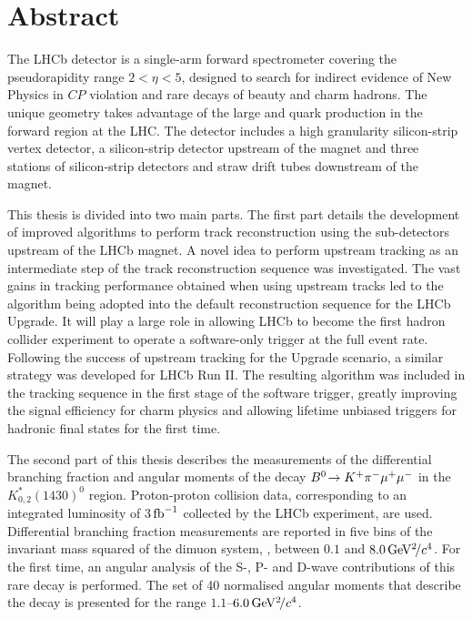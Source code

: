 \section*{Abstract}

The LHCb detector is a single-arm forward spectrometer covering the pseudorapidity range $2 < \eta < 5$, designed to search for indirect evidence of New Physics in $C\!P$ violation and rare decays of beauty and charm hadrons. The unique geometry takes advantage of the large \bquark and \cquark quark production in the forward region at the LHC. The detector includes a high granularity silicon-strip vertex detector, a silicon-strip detector upstream of the magnet and three stations of silicon-strip detectors and straw drift tubes downstream of the magnet.

This thesis is divided into two main parts. The first part details the development of improved algorithms to perform track reconstruction using the sub-detectors upstream of the LHCb magnet. A novel idea to perform upstream tracking as an intermediate step of the track reconstruction sequence was investigated. The vast gains in tracking performance obtained when using upstream tracks led to the algorithm being adopted into the default reconstruction sequence for the LHCb Upgrade. It will play a large role in allowing LHCb to become the first hadron collider experiment to operate a software-only trigger at the full event rate. Following the success of upstream tracking for the Upgrade scenario, a similar strategy was developed for LHCb Run II. The resulting algorithm was included in the tracking sequence in the first stage of the software trigger, greatly improving the signal efficiency for charm physics and allowing lifetime unbiased triggers for hadronic final states for the first time.

The second part of this thesis describes the measurements of the differential branching fraction and angular moments of the decay ${B}^0\!\rightarrow K^{+}\pi^{-}\mu^{+}\mu^{-}$ in the $K^{*}_{0,2}(1430)^{0}$ region. Proton-proton collision data, corresponding to an integrated luminosity of 3$\mbox{\,fb}^{-1}$ collected by the LHCb experiment, are used. Differential branching fraction measurements are reported in five bins of the invariant mass squared of the dimuon system, \qsq, between $0.1$ and $8.0{\mathrm{\,Ge\kern -0.1em V^2\!/}c^4}$. For the first time, an angular analysis of the S-, P- and D-wave contributions of this rare decay is performed. The set of 40 normalised angular moments that describe the decay is presented for the \qsq range $1.1$--$6.0{\mathrm{\,Ge\kern -0.1em V^2\!/}c^4}$. 